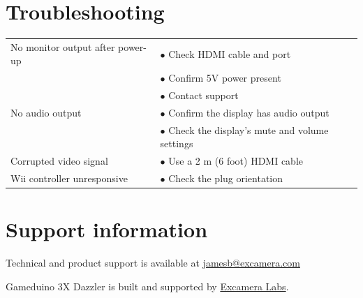 \documentclass{article}
\newcommand{\device}{Gameduino 3X Dazzler}
\newcommand{\gap}{\vspace{10pt}}
\begin{document}
\newpage
\section{Troubleshooting}

\gap
\begin{tabular}{|l|l|}
\hline
No monitor output after power-up     & $\bullet$ Check HDMI cable and port \\
                                     & $\bullet$ Confirm 5V power present \\
                                     & $\bullet$ Contact support \\
\hline
No audio output                      & $\bullet$ Confirm the display has audio output \\
                                     & $\bullet$ Check the display's mute and volume settings \\
\hline
Corrupted video signal               & $\bullet$ Use a 2 m (6 foot) HDMI cable
\index{HDMI!cable length} \\
\hline
Wii controller unresponsive          & $\bullet$ Check the plug orientation \\
\hline
\end{tabular}
\gap

\section{Support information}

Technical and product support is available at
\href{mailto:jamesb@excamera.com}{jamesb@excamera.com}

\device{} is built and supported by
\href{https://excamera.com}{Excamera Labs}.


\newpage
\raggedright
{}
\renewcommand{\indexname}{Index}
\printindex
\end{document}
